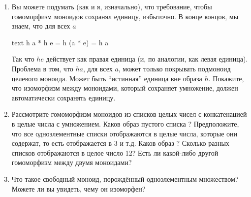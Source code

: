 \begin{enumerate}
  \tightlist
  \item
        Вы можете подумать (как и я, изначально), что требование, чтобы
        гомоморфизм моноидов сохранял единицу, избыточно. В конце концов, мы
        знаем, что для всех $a$

        \begin{snip}{text}
h a * h e = h (a * e) = h a
\end{snip}
        Так что $h e$ действует как правая единица (и, по аналогии, как левая
        единица). Проблема в том, что $h a$, для всех $a$, может
        только покрывать подмоноид целевого моноида. Может быть ``истинная''
        единица вне образа $h$. Покажите, что изоморфизм
        между моноидами, который сохраняет умножение, должен автоматически
        сохранять единицу.
  \item
        Рассмотрите гомоморфизм моноидов из списков целых чисел с
        конкатенацией в целые числа с умножением. Каков образ
        пустого списка \code{{[}{]}}? Предположите, что все одноэлементные списки
        отображаются в целые числа, которые они содержат, то есть \code{{[}3{]}}
        отображается в 3 и т.д. Каков образ \code{{[}1, 2, 3, 4{]}}?
        Сколько разных списков отображаются в целое число 12? Есть ли какой-либо другой
        гомоморфизм между двумя моноидами?
  \item
        Что такое свободный моноид, порождённый одноэлементным множеством? Можете ли вы увидеть,
        чему он изоморфен?
\end{enumerate}
